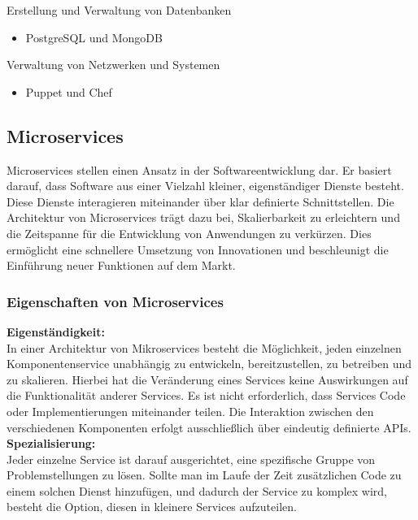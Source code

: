 Erstellung und Verwaltung von Datenbanken
\begin{itemize}
    \item PostgreSQL und MongoDB
\end{itemize}

Verwaltung von Netzwerken und Systemen
\begin{itemize}
    \item Puppet und Chef
\end{itemize}

\newpage
\subsection*{Microservices}

Microservices stellen einen Ansatz in der Softwareentwicklung dar. Er basiert darauf, 
dass Software aus einer Vielzahl kleiner, eigenständiger Dienste besteht. 
Diese Dienste interagieren miteinander über klar definierte Schnittstellen.
Die Architektur von Microservices trägt dazu bei, Skalierbarkeit zu erleichtern und die 
Zeitspanne für die Entwicklung von Anwendungen zu verkürzen. 
Dies ermöglicht eine schnellere Umsetzung von Innovationen und beschleunigt die Einführung 
neuer Funktionen auf dem Markt.

\subsubsection*{Eigenschaften von Microservices}

\textbf{Eigenständigkeit:}\\
In einer Architektur von Mikroservices besteht die Möglichkeit, jeden einzelnen Komponentenservice 
unabhängig zu entwickeln, bereitzustellen, zu betreiben und zu skalieren. 
Hierbei hat die Veränderung eines Services keine Auswirkungen auf die Funktionalität anderer Services. 
Es ist nicht erforderlich, dass Services Code oder Implementierungen miteinander teilen. 
Die Interaktion zwischen den verschiedenen Komponenten erfolgt ausschließlich 
über eindeutig definierte APIs.\\

\textbf{Spezialisierung:}\\
Jeder einzelne Service ist darauf ausgerichtet, eine spezifische Gruppe von 
Problemstellungen zu lösen. Sollte man im Laufe der Zeit zusätzlichen Code zu einem 
solchen Dienst hinzufügen, und dadurch der Service zu komplex wird, besteht die Option, 
diesen in kleinere Services aufzuteilen.

\newpage
